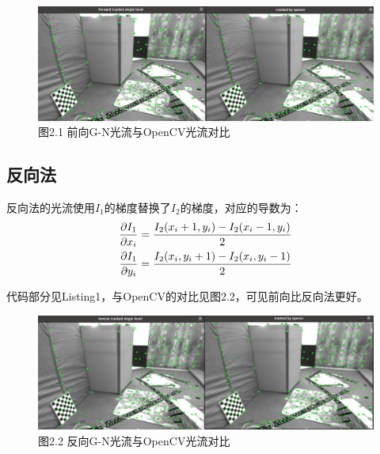 \documentclass[40pt,a4paper，UTF8]{ctexart}
\numberwithin{equation}{section}
\begin{document}
\begin{figure}[H]
\centering
\includegraphics[width=4.8in]{ch6_2_1.png} {图2.1  前向G-N光流与OpenCV光流对比}
\end{figure}


\subsection{反向法}
反向法的光流使用$I_1$的梯度替换了$I_2$的梯度，对应的导数为：
\begin{align}
\frac{\partial I_1}{\partial x_i}=\frac{I_2(x_i+1,y_i)-I_2(x_i-1,y_i)}{2} \notag \\
\frac{\partial I_1}{\partial y_i}=\frac{I_2(x_i,y_i+1)-I_2(x_i,y_i-1)}{2}
\end{align}

代码部分见Listing1，与OpenCV的对比见图2.2，可见前向比反向法更好。
\begin{figure}[H]
\centering
\includegraphics[width=4.8in]{ch6_2_2.png} {图2.2  反向G-N光流与OpenCV光流对比}
\end{figure}
\end{document}
